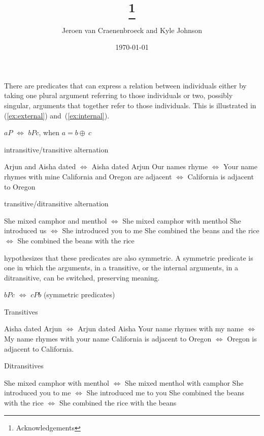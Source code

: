 \documentclass[twoside, 12pt]{article}
\title{\paper\thanks{Acknowledgements}}
\author{Jeroen van Craenenbroeck and Kyle Johnson}
\date{\today}
\begin{document}
\begin{titlepage} 
\maketitle 
\thispagestyle{empty}
\begin{abstract}

 \noindent 
 
 \end{abstract}
 \end{titlepage} 

\thispagestyle{empty}
\noindent
There are predicates that can express a relation between individuals either by taking one plural argument referring to those individuals or two, possibly singular, arguments that together refer to those individuals. This is illustrated in (\ref{ex:external}) and~(\ref{ex:internal}).
\begin{exe}
\raggedright
\ex \label{ex:plainsymm} $aP$ $\Leftrightarrow$ $bPc$, when $a = b \oplus\ c$
\begin{xlist}
  \ex \label{ex:external} intransitive/transitive alternation
  \begin{xlist}
    \ex Arjun and Aisha dated $\Leftrightarrow$ Aisha dated Arjun
    \ex Our names rhyme $\Leftrightarrow$ Your name rhymes with mine
    \ex California and Oregon are adjacent $\Leftrightarrow$ California is adjacent to Oregon
  \end{xlist}
  \ex \label{ex:internal} transitive/ditransitive alternation
  \begin{xlist}
    \ex She mixed camphor and menthol $\Leftrightarrow$ She mixed camphor with menthol
    \ex She introduced us $\Leftrightarrow$ She introduced you to me
    \ex She combined the beans and the rice $\Leftrightarrow$ She combined the beans with the rice
  \end{xlist}
\end{xlist}
\end{exe}
\citet{Winter:2018} hypothesizes that these predicates are also symmetric. A symmetric predicate is one in which the arguments, in a transitive, or the internal arguments, in a ditransitive, can be switched, preserving meaning.
\begin{exe}
\raggedright
  \ex \label{ex:symm} $bPc$ $\Leftrightarrow$ $cPb$ (symmetric predicates)
  \begin{xlist}
  \ex \label{ex:symmtrans} Transitives
  \begin{xlist}
    \ex Aisha dated Arjun $\Leftrightarrow$ Arjun dated Aisha
    \ex Your name rhymes with my name $\Leftrightarrow$ My name rhymes with your name
    \ex California is adjacent to Oregon $\Leftrightarrow$ Oregon is adjacent to California.
  \end{xlist}
  \ex Ditransitives
  \begin{xlist}
    \ex She mixed camphor with menthol $\Leftrightarrow$ She mixed menthol with camphor 
    \ex She introduced you to me $\Leftrightarrow$ She introduced me to you
    \ex She combined the beans with the rice $\Leftrightarrow$ She combined the rice with the beans
  \end{xlist}
\end{xlist}
\end{exe}
\end{document}
